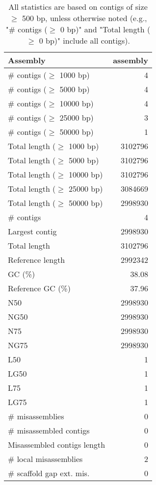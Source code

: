 \documentclass[12pt,a4paper]{article}
\begin{document}
\begin{table}[ht]
\begin{center}
\caption{All statistics are based on contigs of size $\geq$ 500 bp, unless otherwise noted (e.g., "\# contigs ($\geq$ 0 bp)" and "Total length ($\geq$ 0 bp)" include all contigs).}
\begin{tabular}{|l*{1}{|r}|}
\hline
Assembly & assembly \\ \hline
\# contigs ($\geq$ 1000 bp) & 4 \\ \hline
\# contigs ($\geq$ 5000 bp) & 4 \\ \hline
\# contigs ($\geq$ 10000 bp) & 4 \\ \hline
\# contigs ($\geq$ 25000 bp) & 3 \\ \hline
\# contigs ($\geq$ 50000 bp) & 1 \\ \hline
Total length ($\geq$ 1000 bp) & 3102796 \\ \hline
Total length ($\geq$ 5000 bp) & 3102796 \\ \hline
Total length ($\geq$ 10000 bp) & 3102796 \\ \hline
Total length ($\geq$ 25000 bp) & 3084669 \\ \hline
Total length ($\geq$ 50000 bp) & 2998930 \\ \hline
\# contigs & 4 \\ \hline
Largest contig & 2998930 \\ \hline
Total length & 3102796 \\ \hline
Reference length & 2992342 \\ \hline
GC (\%) & 38.08 \\ \hline
Reference GC (\%) & 37.96 \\ \hline
N50 & 2998930 \\ \hline
NG50 & 2998930 \\ \hline
N75 & 2998930 \\ \hline
NG75 & 2998930 \\ \hline
L50 & 1 \\ \hline
LG50 & 1 \\ \hline
L75 & 1 \\ \hline
LG75 & 1 \\ \hline
\# misassemblies & 0 \\ \hline
\# misassembled contigs & 0 \\ \hline
Misassembled contigs length & 0 \\ \hline
\# local misassemblies & 2 \\ \hline
\# scaffold gap ext. mis. & 0 \\ \hline

\end{tabular}
\end{center}
\end{table}
\end{document}
